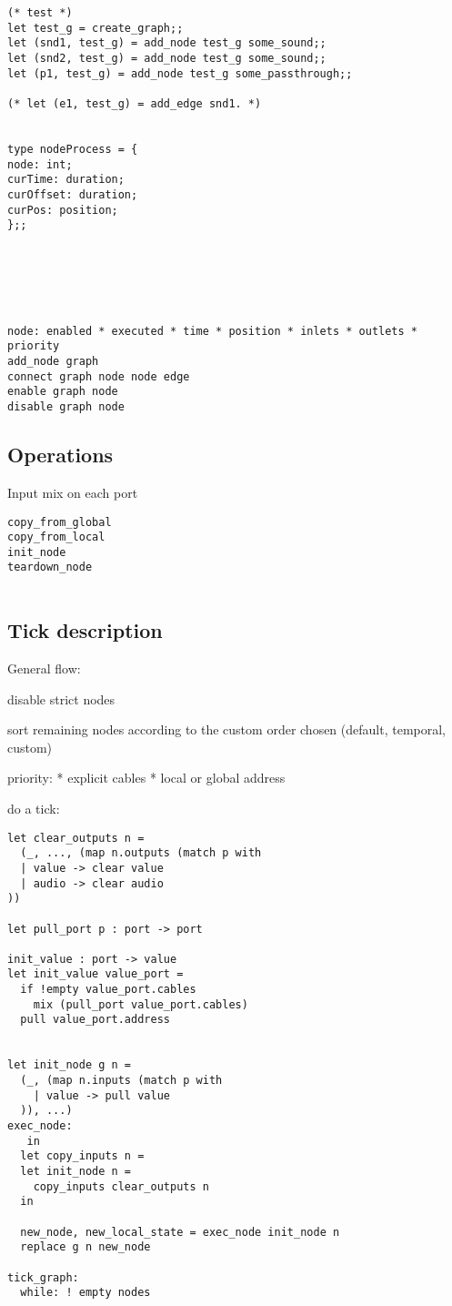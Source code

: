 \documentclass[applsci,article,submit,moreauthors,pdftex,10pt,a4paper]{mdpi}
\begin{document}
\begin{lstlisting}
(* test *)
let test_g = create_graph;;
let (snd1, test_g) = add_node test_g some_sound;;
let (snd2, test_g) = add_node test_g some_sound;;
let (p1, test_g) = add_node test_g some_passthrough;;

(* let (e1, test_g) = add_edge snd1. *)


type nodeProcess = { 
node: int; 
curTime: duration; 
curOffset: duration;
curPos: position;    
};;






node: enabled * executed * time * position * inlets * outlets * priority
add_node graph 
connect graph node node edge
enable graph node
disable graph node

\end{lstlisting}
\subsection{Operations}
Input mix on each port

\begin{lstlisting}
copy_from_global
copy_from_local
init_node
teardown_node


\end{lstlisting} 


\subsection{Tick description}

General flow: 

disable strict nodes

sort remaining nodes according to the custom order chosen (default, temporal, custom)

priority: 
* explicit cables
* local or global address

do a tick: 

\begin{lstlisting}
let clear_outputs n = 
  (_, ..., (map n.outputs (match p with 
  | value -> clear value
  | audio -> clear audio
))

let pull_port p : port -> port 

init_value : port -> value
let init_value value_port = 
  if !empty value_port.cables
    mix (pull_port value_port.cables)
  pull value_port.address


let init_node g n = 
  (_, (map n.inputs (match p with 
    | value -> pull value
  )), ...) 
exec_node: 
   in
  let copy_inputs n = 
  let init_node n = 
    copy_inputs clear_outputs n      
  in 
  
  new_node, new_local_state = exec_node init_node n
  replace g n new_node 
    
tick_graph: 
  while: ! empty nodes 
  
\end{lstlisting}
\end{document}
